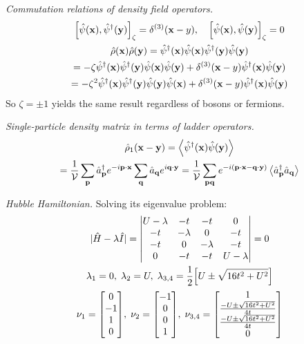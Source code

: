 \documentclass{report}
\begin{document}
\begin{subquests}
	\item \emph{Commutation relations of density field operators.}
	\begin{gather*}
		\bqty{\hat{\psi}\pqty{\vb x}, \hat{\psi}^{\dagger}\pqty{\vb y}}_{\zeta} = \delta^{\pqty{3}}\pqty{\vb x - y},\quad \bqty{\hat{\psi}\pqty{\vb x}, \hat{\psi}\pqty{\vb y}}_{\zeta} = 0 \\
		\hat{\rho}\pqty{\vb x}\hat{\rho}\pqty{\vb y} = \hat{\psi}^{\dagger}\pqty{\vb x}\hat{\psi}\pqty{\vb x}\hat{\psi}^{\dagger}\pqty{\vb y}\hat{\psi}\pqty{\vb y} \\
		= -\zeta\hat{\psi}^{\dagger}\pqty{\vb x}\hat{\psi}^{\dagger}\pqty{\vb y}\hat{\psi}\pqty{\vb x}\hat{\psi}\pqty{\vb y} + \delta^{\pqty{3}}\pqty{\vb x - y}\hat{\psi}^{\dagger}\pqty{\vb x}\hat{\psi}\pqty{\vb y} \\
		= -\zeta^2\hat{\psi}^{\dagger}\pqty{\vb x}\hat{\psi}^{\dagger}\pqty{\vb y}\hat{\psi}\pqty{\vb y}\hat{\psi}\pqty{\vb x} + \delta^{\pqty{3}}\pqty{\vb x - y}\hat{\psi}^{\dagger}\pqty{\vb x}\hat{\psi}\pqty{\vb y}
	\end{gather*}
	So $\zeta = \pm 1$ yields the same result regardless of bosons or fermions.

	\item \emph{Single-particle density matrix in terms of ladder operators.}
	\begin{gather*}
		\hat{\rho}_1\pqty{\vb x - \vb y} = \expval{\hat{\psi}^{\dagger}\pqty{\vb x}\hat{\psi}\pqty{\vb y}} \\
		= \frac{1}{\cal{V}}\sum_{\vb p}\hat{a}_{\vb p}^{\dagger}e^{-i\vb p\cdot \vb x}\sum_{\vb q}\hat{a}_{\vb q}e^{i\vb q\cdot \vb y} = \frac{1}{\cal{V}}\sum_{\vb{pq}}e^{-i\pqty{\vb p\cdot \vb x - \vb q\cdot \vb y}}\expval{\hat{a}_{\vb p}^{\dagger}\hat{a}_{\vb q}}
	\end{gather*}

	\item \emph{Hubble Hamiltonian.} Solving its eigenvalue problem:
	\begin{gather*}
		|\hat{H} - \lambda\hat{I}| = \mqty|
			U - \lambda & -t & -t & 0 \\
			-t & -\lambda & 0 & -t \\
			-t & 0 & -\lambda & -t \\
			0 & -t & -t & U - \lambda
		| = 0 \\
		\lambda_1 = 0,\;\lambda_2 = U,\;\lambda_{3,4} = \frac{1}{2}\bqty{U \pm \sqrt{16t^2 + U^2}} \\
		\nu_1 = \mqty[0 \\ -1 \\ 1 \\ 0],\; \nu_2 = \mqty[-1 \\ 0 \\ 0 \\ 1],\; \nu_{3,4} = \mqty[1\\ \frac{-U \pm \sqrt{16t^2 + U^2}}{4t} \\ \frac{-U \pm \sqrt{16t^2 + U^2}}{4t} \\ 0]
	\end{gather*}
\end{subquests}
\end{document}
